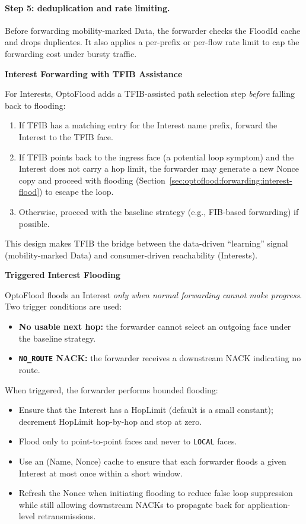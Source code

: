 \paragraph{Step 5: deduplication and rate limiting.}
Before forwarding mobility-marked Data, the forwarder checks the FloodId cache and drops duplicates.
It also applies a per-prefix or per-flow rate limit to cap the forwarding cost under bursty traffic.

\textbf{Interest Forwarding with TFIB Assistance}

For Interests, OptoFlood adds a TFIB-assisted path selection step \emph{before} falling back to flooding:

\begin{enumerate}
  \item If TFIB has a matching entry for the Interest name prefix, forward the Interest to the TFIB face.
  \item If TFIB points back to the ingress face (a potential loop symptom) and the Interest does not carry a hop limit, the forwarder may generate a new Nonce copy and proceed with flooding (Section~\ref{sec:optoflood:forwarding:interest-flood}) to escape the loop.
  \item Otherwise, proceed with the baseline strategy (e.g., FIB-based forwarding) if possible.
\end{enumerate}

This design makes TFIB the bridge between the data-driven ``learning'' signal (mobility-marked Data) and consumer-driven reachability (Interests).

\textbf{Triggered Interest Flooding}

OptoFlood floods an Interest \emph{only when normal forwarding cannot make progress}.
Two trigger conditions are used:

\begin{itemize}
  \item \textbf{No usable next hop:} the forwarder cannot select an outgoing face under the baseline strategy.
  \item \textbf{\texttt{NO\_ROUTE} NACK:} the forwarder receives a downstream NACK indicating no route.
\end{itemize}

When triggered, the forwarder performs bounded flooding:

\begin{itemize}
  \item Ensure that the Interest has a HopLimit (default is a small constant); decrement HopLimit hop-by-hop and stop at zero.
  \item Flood only to point-to-point faces and never to \texttt{LOCAL} faces.
  \item Use an (Name, Nonce) cache to ensure that each forwarder floods a given Interest at most once within a short window.
  \item Refresh the Nonce when initiating flooding to reduce false loop suppression while still allowing downstream NACKs to propagate back for application-level retransmissions.
\end{itemize}

